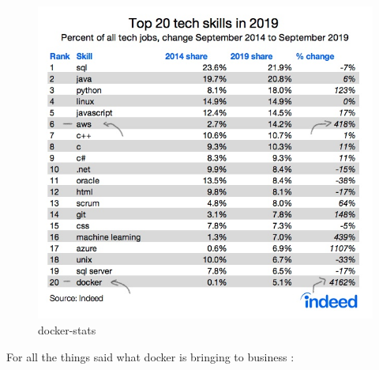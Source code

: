\documentclass[
  12pt,
  a4paper,
  oneside]{book}
\theoremstyle{definition}
\theoremstyle{definition}
\theoremstyle{definition}
\theoremstyle{remark}
\begin{document}
\begin{figure}
\centering
\includegraphics{images/Inkedindeed_jobs_LI.jpg}
\caption{docker-stats}
\end{figure}

For all the things said what docker is bringing to business \citep{red_hat_customer_portal}:
\end{document}
